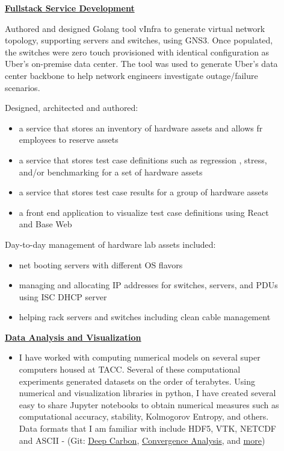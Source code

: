 \documentclass[11pt]{ltxdoc}
\begin{document}
  \begin{description}
 	\item[] \textbf{\underline{Fullstack Service Development}}
 	
 	Authored and designed Golang tool vInfra to generate virtual network topology, supporting servers and switches, using GNS3. Once populated, the switches were zero touch provisioned with identical configuration as Uber's on-premise data center. The tool was used to generate Uber's data center backbone to help network engineers investigate outage/failure scenarios.
 	
 	Designed, architected and authored:
 	\begin{itemize}
 	  \item a service that stores an inventory of hardware assets and allows fr employees to reserve assets
 	  \item a service that stores test case definitions such as regression , stress, and/or benchmarking for a set of hardware assets
 	  \item a service that stores test case results for a group of hardware assets
 	  \item a front end application to visualize test case definitions using React and Base Web
 	\end{itemize}
 	
 	Day-to-day management of hardware lab assets included: 
 	\begin{itemize}
 	  \item net booting servers with different OS flavors
 	  \item managing and allocating IP addresses for switches, servers, and PDUs using ISC DHCP server
 	  \item helping rack servers and switches including clean cable management
 	\end{itemize}
 	
    \item[] \textbf{\underline{Data Analysis and Visualization}}
    
      \begin{itemize}
      	\item I have worked with computing numerical models on several super computers housed at TACC. Several of these computational experiments generated datasets on the order of terabytes. Using numerical and visualization libraries in python, I have created several easy to share Jupyter notebooks to obtain numerical measures such as computational accuracy, stability, Kolmogorov Entropy, and others. Data formats that I am familiar with include HDF5, VTK, NETCDF and ASCII - (Git: \href{https://github.com/hlokavarapu/Prospectus/blob/master/SlideDeck/MeetingPresentation.ipynb}{Deep Carbon}, \href{https://github.com/EGP-CIG-REU/SECOND_PARTICLE_PAPER/blob/master/00JUPYTER_NOTEBOOKS/egp_time_dependent_annulus_v-02/egp_time_dependent_annulus_v-02-Exact.ipynb}{Convergence Analysis}, and \href{https://github.com/hlokavarapu/Geology_Journal/tree/master/00JUPYTER}{more})
        

\end{itemize}
\end{description}
\end{document}
